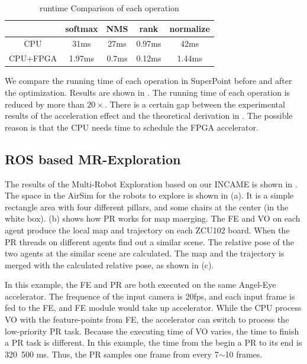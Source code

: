 \begin{table}[t]
  \centering
  \caption{runtime Comparison of each operation}
\begin{tabular}{|c|c|c|c|c|}
  \hline
             &    softmax &        NMS &       rank &  normalize \bigstrut\\
  \hline
         CPU &       31ms &       27ms &       0.97ms &       42ms \bigstrut\\
  \hline
    CPU+FPGA &     1.97ms &      0.7ms &     0.12ms &     1.44ms \bigstrut\\
  \hline
  \end{tabular}  
  
  \label{tab:optimization}%
\end{table}%

We compare the running time of each operation in SuperPoint before and after the optimization. Results are shown in . The running time of each operation is reduced by more than $20\times$. There is a certain gap between the experimental results of the acceleration effect and the theoretical derivation in . The possible reason is that the CPU needs time to schedule the FPGA accelerator.

\subsection{ ROS based MR-Exploration }

The results of the Multi-Robot Exploration based on our INCAME is shown in . The space in the AirSim for the robots to explore is shown in (a). It is a simple rectangle area with four different pillars, and some chairs at the center (in the white box).  (b) shows how PR works for map maerging. The FE and VO on each agent produce the local map and trajectory on each ZCU102 board. When the PR threads on different agents find out a similar scene. The relative pose of the two agents at the similar scene are calculated. The map and the trajectory is merged with the calculated relative pose, as shown in (c).

In this example, the FE and PR are both executed on the same Angel-Eye accelerator. The frequence of the input camera is 20fps, and each input frame is fed to the FE, and FE module would take up accelerator. While the CPU process VO with the feature-points from FE, the accelerator can switch to process the low-priority PR task. Because the executing time of VO varies, the time to finish a PR task is different. In this example, the time from the begin a PR to its end is 320~500 ms. Thus, the PR samples one frame from every 7$\sim$10 frames.